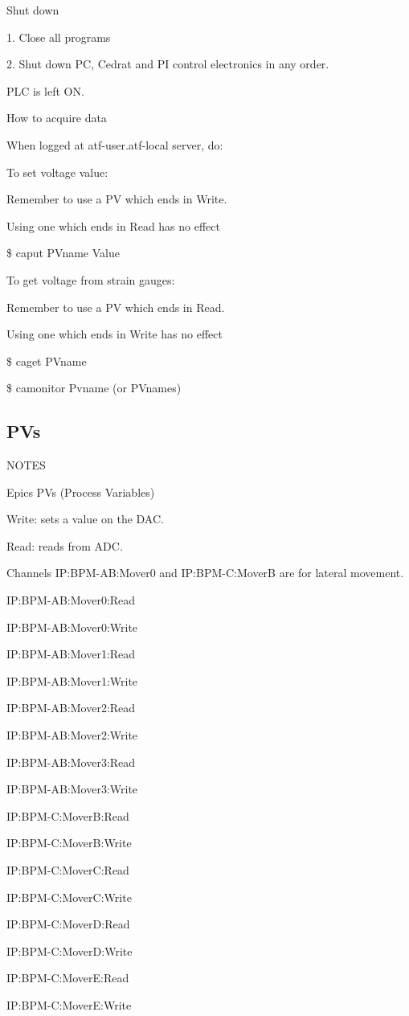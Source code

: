 Shut down\par
1. Close all programs\par
2. Shut down PC, Cedrat and PI control electronics in any order.\par
PLC is left ON.\par
How to acquire data\par
When logged at atf-user.atf-local server, do:\par
To set voltage value:\par
Remember to use a PV which ends in Write.\par
Using one which ends in Read has no effect\par
\$ caput PVname Value\par
To get voltage from strain gauges:\par
Remember to use a PV which ends in Read.\par
Using one which ends in Write has no effect\par
\$ caget PVname\par
\$ camonitor Pvname (or PVnames)\par

\subsection{PVs}
NOTES\par
Epics PVs (Process Variables)\par
Write: sets a value on the DAC.\par
Read: reads from ADC.\par
Channels IP:BPM-AB:Mover0 and IP:BPM-C:MoverB are for lateral movement.\par

IP:BPM-AB:Mover0:Read\par
IP:BPM-AB:Mover0:Write\par
IP:BPM-AB:Mover1:Read\par
IP:BPM-AB:Mover1:Write\par
IP:BPM-AB:Mover2:Read\par
IP:BPM-AB:Mover2:Write\par
IP:BPM-AB:Mover3:Read\par
IP:BPM-AB:Mover3:Write\par 

IP:BPM-C:MoverB:Read\par 
IP:BPM-C:MoverB:Write\par 
IP:BPM-C:MoverC:Read\par 
IP:BPM-C:MoverC:Write\par 
IP:BPM-C:MoverD:Read\par 
IP:BPM-C:MoverD:Write\par 
IP:BPM-C:MoverE:Read\par 
IP:BPM-C:MoverE:Write\par 

